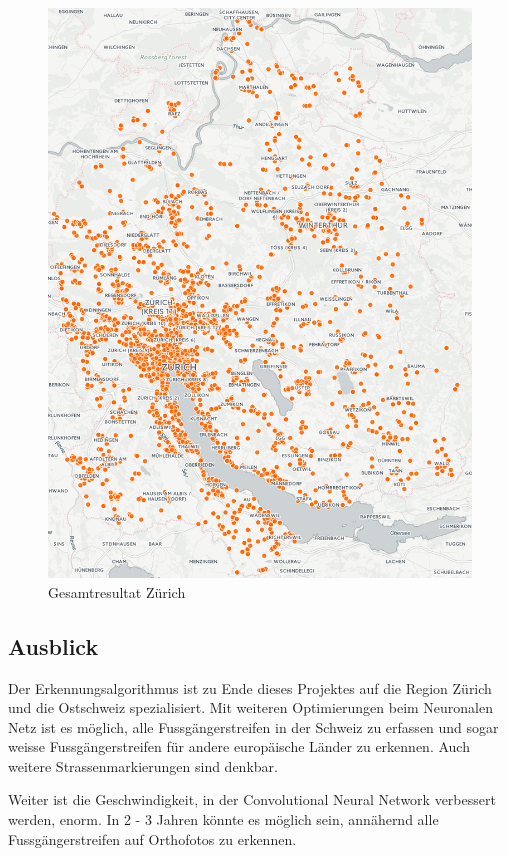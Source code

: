 \\
\begin{figure}[H]
	\centering
	\includegraphics[width=\textwidth -80mm]{images/karte.png}
	\caption{Gesamtresultat Zürich}
\end{figure}

\subsection*{Ausblick}
Der Erkennungsalgorithmus ist zu Ende dieses Projektes auf die Region Zürich und die Ostschweiz spezialisiert. Mit weiteren Optimierungen beim Neuronalen Netz ist es möglich, alle Fussgängerstreifen in der Schweiz zu erfassen und sogar weisse Fussgängerstreifen für andere europäische Länder zu erkennen. Auch weitere Strassenmarkierungen sind denkbar.

Weiter ist die Geschwindigkeit, in der Convolutional Neural Network verbessert werden, enorm. In 2 - 3 Jahren könnte es möglich sein, annähernd alle Fussgängerstreifen auf Orthofotos zu erkennen.
\newpage